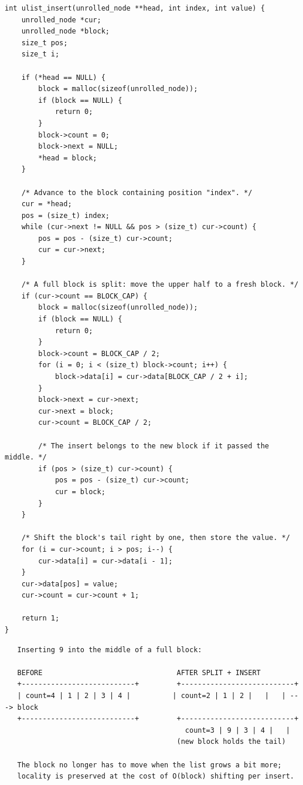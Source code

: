 \begin{lstlisting}[caption={Insert at a 0-based index, splitting when full.}]
int ulist_insert(unrolled_node **head, int index, int value) {
    unrolled_node *cur;
    unrolled_node *block;
    size_t pos;
    size_t i;

    if (*head == NULL) {
        block = malloc(sizeof(unrolled_node));
        if (block == NULL) {
            return 0;
        }
        block->count = 0;
        block->next = NULL;
        *head = block;
    }

    /* Advance to the block containing position "index". */
    cur = *head;
    pos = (size_t) index;
    while (cur->next != NULL && pos > (size_t) cur->count) {
        pos = pos - (size_t) cur->count;
        cur = cur->next;
    }

    /* A full block is split: move the upper half to a fresh block. */
    if (cur->count == BLOCK_CAP) {
        block = malloc(sizeof(unrolled_node));
        if (block == NULL) {
            return 0;
        }
        block->count = BLOCK_CAP / 2;
        for (i = 0; i < (size_t) block->count; i++) {
            block->data[i] = cur->data[BLOCK_CAP / 2 + i];
        }
        block->next = cur->next;
        cur->next = block;
        cur->count = BLOCK_CAP / 2;

        /* The insert belongs to the new block if it passed the middle. */
        if (pos > (size_t) cur->count) {
            pos = pos - (size_t) cur->count;
            cur = block;
        }
    }

    /* Shift the block's tail right by one, then store the value. */
    for (i = cur->count; i > pos; i--) {
        cur->data[i] = cur->data[i - 1];
    }
    cur->data[pos] = value;
    cur->count = cur->count + 1;

    return 1;
}
\end{lstlisting}

\begin{verbatim}
   Inserting 9 into the middle of a full block:

   BEFORE                                AFTER SPLIT + INSERT
   +---------------------------+         +---------------------------+
   | count=4 | 1 | 2 | 3 | 4 |          | count=2 | 1 | 2 |   |   | ---> block
   +---------------------------+         +---------------------------+
                                           count=3 | 9 | 3 | 4 |   |
                                         (new block holds the tail)

   The block no longer has to move when the list grows a bit more;
   locality is preserved at the cost of O(block) shifting per insert.
\end{verbatim}


